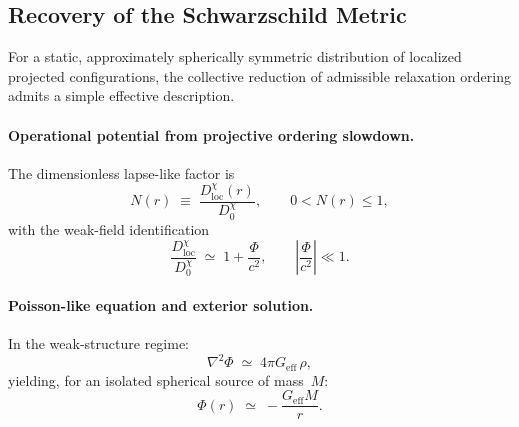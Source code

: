 \subsection{Recovery of the Schwarzschild Metric}
  \label{subsec:recovery-of-the-schwarzschild-metric}

  For a static, approximately spherically symmetric distribution of
  localized projected configurations, the collective reduction of admissible
  relaxation ordering admits a simple effective description.

  \paragraph{Operational potential from projective ordering slowdown.}
    The dimensionless lapse-like factor is
    \begin{equation}
      N(r) \;\equiv\;
      \frac{D^\chi_{\mathrm{loc}}(r)}{D^\chi_0},
      \qquad 0 < N(r)\le 1 ,
    \end{equation}
    with the weak-field identification
    \begin{equation}
      \frac{D^\chi_{\mathrm{loc}}}{D^\chi_0}
      \;\simeq\; 1 + \frac{\Phi}{c^2},
      \qquad
      \left|\frac{\Phi}{c^2}\right|\ll 1.
      \label{eq:phi_from_slowdown}
    \end{equation}

  \paragraph{Poisson-like equation and exterior solution.}
    In the weak-structure regime:
    \begin{equation}
      \nabla^2 \Phi \;\simeq\; 4\pi G_{\mathrm{eff}}\,\rho ,
      \label{eq:poisson_phi}
    \end{equation}
    yielding, for an isolated spherical source of mass~$M$:
    \begin{equation}
      \Phi(r) \;\simeq\; -\frac{G_{\mathrm{eff}} M}{r}.
      \label{eq:phi_point_mass}
    \end{equation}

